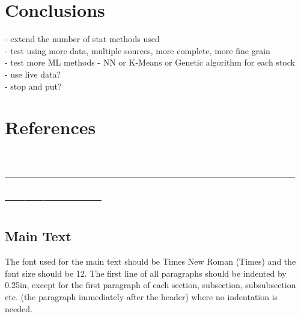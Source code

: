 \documentclass[12pt,a4paper]{article}
\begin{document}
\iffalse
#################################################################################
\fi

\section{Conclusions}

\iffalse
This section summarises the main points of this paper.  Do not replicate the abstract as the conclusion.  A conclusion might elaborate on the importance of the work or suggest applications and extensions.  This section should be no more than 1 page in length.
\fi

- extend the number of stat methods used \\
- test using more data, multiple sources, more complete, more fine grain \\
- test more ML methods - NN or K-Means or Genetic algorithm for each stock\\
- use live data? \\
- stop and put? \\

\iffalse
#################################################################################
\fi

\section{References}



\nocite{*}

\iffalse
#################################################################################
\fi

\iffalse
\section*{------------------------------------------------------------}

\subsection{Main Text}

The font used for the main text should be Times New Roman (Times) and the font size should be 12.  The first line of all paragraphs should be indented by 0.25in, except for the first paragraph of each section, subsection, subsubsection etc. (the paragraph immediately after the header) where no indentation is needed.
\end{document}
